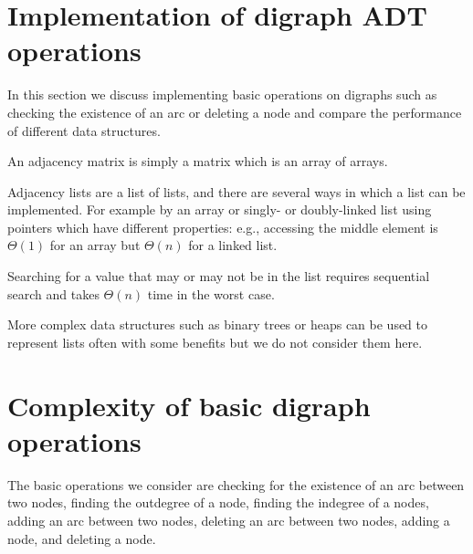 %
%
%
%
%
%
%

\section{Implementation of digraph ADT operations}
\label{sec:graphadtimpl}

In this section we discuss implementing basic operations on digraphs such as checking the existence of an arc or deleting a node and compare the performance of different data structures.

An adjacency matrix is simply a matrix which is an array of arrays. 

Adjacency lists are a list of lists, and there are several ways in which a list can be implemented. For
example by an array or singly- or doubly-linked list using pointers which have different properties:
e.g., accessing the middle element is $\Theta(1)$ for an array but $\Theta(n)$ for a linked list. 

Searching for a value that may or may not be in the list requires sequential search
and takes $\Theta(n)$ time in the worst case. 

More complex data structures such as binary trees or heaps can be used to represent lists often with some benefits but we do not consider them here. 

\section{Complexity of basic digraph operations}
The basic operations we consider are checking for the existence of an arc between two nodes, finding the outdegree of a node, 
finding the indegree of a nodes, adding an arc between two nodes, deleting an arc between two nodes, adding a node, and deleting a node. 

